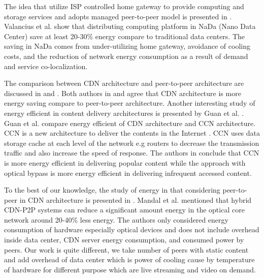 The idea that utilize ISP controlled home gateway to provide computing and storage services and adopts managed peer-to-peer model is presented in \cite{valancius2009greening}. 
Valancius et al. \cite{valancius2009greening} show that distributing computing platform in NaDa (Nano Data Center) save at least 20-30\% energy compare to traditional data centers.
The saving in NaDa comes from under-utilizing home gateway, avoidance of cooling costs, and the reduction of network energy consumption as a result of demand and service co-localization.

The comparison between CDN architecture and peer-to-peer architecture are discussed in \cite{baliga2007energy} and \cite{feldmann2010energy}.
Both authors in \cite{baliga2007energy} and \cite{feldmann2010energy} agree that CDN architecture is more energy saving compare to peer-to-peer architecture. 
Another interesting study of energy efficient in content delivery architectures is presented by Guan et al. \cite{5963557}.
Guan et al. \cite{5963557} compare energy efficient of CDN architecture and CCN architecture.
CCN is a new architecture to deliver the contents in the Internet \cite{Jacobson:2009:NNC:1658939.1658941}.  
CCN uses data storage cache at each level of the network e.g routers to decrease the transmission traffic and also increase the speed of response.
The authors in \cite{5963557} conclude that CCN is more energy efficient in delivering popular content while the approach with optical bypass is more energy efficient in delivering infrequent accessed content.

To the best of our knowledge, the study of energy in that considering peer-to-peer in CDN architecture is presented in \cite{6524219}.
Mandal et al. \cite{6524219} mentioned that hybrid CDN-P2P systems can reduce a significant amount energy in the optical core network around 20-40\% less energy.  
The authors only considered energy consumption of hardware especially optical devices and does not include overhead inside data center, CDN server energy consumption, and consumed power by peers.
Our work is quite different, we take number of peers with static content and add overhead of data center which is  power of cooling cause by temperature of hardware for different purpose which are live streaming and video on demand.



